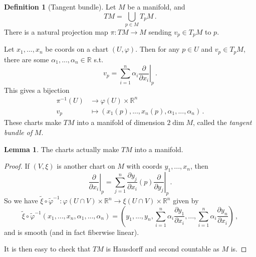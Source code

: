 \documentclass[a4paper,11pt]{article}
\theoremstyle{definition}
\newtheorem*{defn}{Definition}
\newtheorem*{lem}{Lemma}
\numberwithin{equation}{section}
\begin{document}
\begin{defn}[Tangent bundle]
Let $M$ be a manifold, and
\[
TM=\bigcup_{p\in M}T_pM\,.
\]
There is a natural projection map $\pi:TM\rightarrow M$ sending $v_p\in T_pM$ to $p$.

Let $x_1,...,x_n$ be coords on a chart $(U,\varphi)$. Then for any $p\in U$ and $v_p\in T_pM$, there are some $\alpha_1,...,\alpha_n\in\mathbb{R}$ s.t.
\[
v_p=\sum_{i=1}^n\alpha_i\left.\frac{\partial}{\partial x_i}\right|_p\,.
\]
This gives a bijection
\begin{align*}
    \pi^{-1}(U)&\rightarrow\varphi(U)\times\mathbb{R}^n\\
    v_p&\mapsto(x_1(p),...,x_n(p),\alpha_1,...,\alpha_n)\,.
\end{align*}
These charts make $TM$ into a manifold of dimension $2\dim M$, called the \emph{tangent bundle of} $M$. 
\end{defn}

\begin{lem}
The charts actually make $TM$ into a manifold.
\end{lem}

\begin{proof}
If $(V,\xi)$ is another chart on $M$ with coords $y_1,...,x_n$, then 
\[
\left.\frac{\partial}{\partial x_i}\right|_p=\sum_{j=1}^n\frac{\partial y_j}{\partial x_i}(p)\left.\frac{\partial}{\partial y_j}\right|_p\,.
\]
So we have $\tilde{\xi}\circ\tilde{\varphi}^{-1}:\varphi(U\cap V)\times\mathbb{R}^n\rightarrow\xi(U\cap V)\times\mathbb{R}^n$ given by
\[
\tilde{\xi}\circ\tilde{\varphi}^{-1}(x_1,...,x_n,\alpha_1,...,\alpha_n)=\left(y_1,...,y_n,\sum_{i=1}^n\alpha_i\frac{\partial y_1}{\partial x_i},...,\sum_{i=1}^n\alpha_i\frac{\partial y_n}{\partial x_i}\right)\,,
\]
and is smooth (and in fact fiberwise linear).

It is then easy to check that $TM$ is Hausdorff and second countable as $M$ is.
\end{proof}
\end{document}
